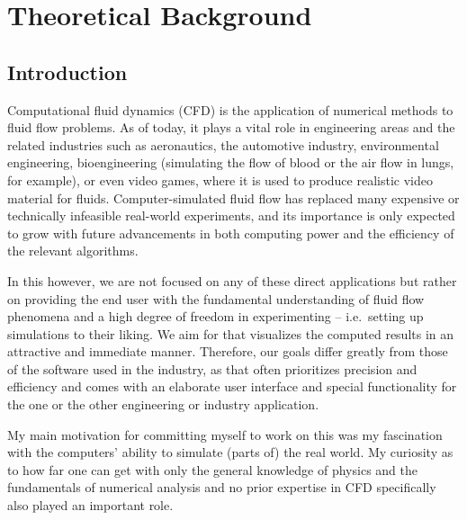 \documentclass[11pt,a4paper,twoside,openright]{report}
\begin{document}


\setcounter{tocdepth}{2}
\tableofcontents

\chapter{Theoretical Background}
\pagestyle{fancy}

\section{Introduction}
Computational fluid dynamics (CFD) is the application of numerical methods to fluid flow problems. As of today, it plays a vital role in engineering areas and the related industries such as aeronautics, the automotive industry, environmental engineering, bioengineering (simulating the flow of blood or the air flow in lungs, for example), or even video games, where it is used to produce realistic video material for fluids. Computer-simulated fluid flow has replaced many expensive or technically infeasible real-world experiments, and its importance is only expected to grow with future advancements in both computing power and the efficiency of the relevant algorithms.

In this \this{} however, we are not focused on any of these direct applications but rather on providing the end user with the fundamental understanding of fluid flow phenomena and a high degree of freedom in experimenting -- i.e.\ setting up simulations to their liking. We aim for \software{} that visualizes the computed results in an attractive and immediate manner. Therefore, our goals differ greatly from those of the software used in the industry, as that often prioritizes precision and efficiency and comes with an elaborate user interface and special functionality for the one or the other engineering or industry application.

My main motivation for committing myself to work on this \this{} was my fascination with the computers' ability to simulate (parts of) the real world. My curiosity as to how far one can get with only the general knowledge of physics and the fundamentals of numerical analysis and no prior expertise in CFD specifically also played an important role.
\end{document}
